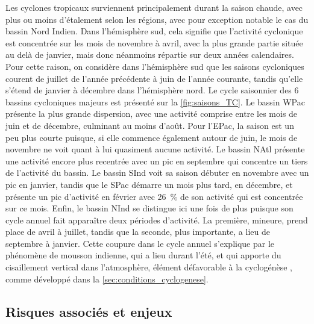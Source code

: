 \documentclass[../main.tex]{subfiles}
\begin{document}
Les cyclones tropicaux surviennent principalement durant la saison chaude, avec plus ou moins d'étalement selon les régions, avec pour exception notable le cas du bassin Nord Indien. Dans l'hémisphère sud, cela signifie que l'activité cyclonique est concentrée sur les mois de novembre à avril, avec la plus grande partie située au delà de janvier, mais donc néanmoins répartie sur deux années calendaires. Pour cette raison, on considère dans l'hémisphère sud que les saisons cycloniques courent de juillet de l'année précédente à juin de
l'année courante, tandis qu'elle s'étend de janvier à décembre dans l'hémisphère nord. Le cycle saisonnier des \num{6} bassins cycloniques majeurs est présenté sur la \cref{fig:saisons_TC}. Le bassin WPac présente la plus grande dispersion, avec une activité comprise entre les mois de juin et de décembre, culminant au moins d'août. Pour l'EPac, la saison est un peu plus courte puisque, si elle commence également autour de juin, le mois de novembre ne voit quant à lui quasiment aucune activité. Le bassin NAtl présente
une activité encore plus recentrée avec un pic en septembre qui concentre un tiers de l'activité du bassin. Le bassin SInd voit sa saison débuter en novembre avec un pic en janvier, tandis que le SPac démarre un mois plus tard, en décembre, et présente un pic d'activité en février avec \SI{26}{\percent} de son activité qui est concentrée sur ce mois. Enfin, le bassin NInd se distingue ici une fois de plus puisque son cycle annuel fait apparaître deux périodes d'activité. La première, mineure,
prend place de avril à juillet, tandis que la seconde, plus importante, a lieu de septembre à janvier. Cette coupure dans le cycle annuel s'explique par le phénomène de mousson indienne, qui a lieu durant l'été, et qui apporte du cisaillement vertical dans l'atmosphère, élément défavorable à la cyclogénèse \parencite{gray_global_1968}, comme développé dans la \cref{sec:conditions_cyclogenese}.

\subsection{Risques associés et enjeux}
\end{document}
